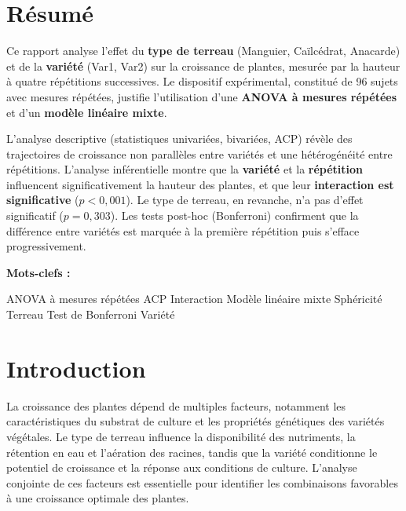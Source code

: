 \documentclass[12pt, a4paper]{report}
\begin{document}
\chapter*{Résumé}


Ce rapport analyse l'effet du \textbf{type de terreau} (Manguier, Caïlcédrat, Anacarde) et
de la \textbf{variété} (Var1, Var2) sur la croissance de plantes, mesurée par la hauteur à
quatre répétitions successives. Le dispositif expérimental, constitué de 96 sujets avec
mesures répétées, justifie l'utilisation d'une \textbf{ANOVA à mesures répétées} et d'un
\textbf{modèle linéaire mixte}.

\vspace{0.4cm}

\noindent
L'analyse descriptive (statistiques univariées, bivariées, ACP) révèle des trajectoires de
croissance non parallèles entre variétés et une hétérogénéité entre répétitions. L'analyse
inférentielle montre que la \textbf{variété} et la \textbf{répétition} influencent
significativement la hauteur des plantes, et que leur \textbf{interaction est significative}
($p < 0{,}001$). Le type de terreau, en revanche, n'a pas d'effet significatif ($p = 0{,}303$).
Les tests post-hoc (Bonferroni) confirment que la différence entre variétés est marquée à la
première répétition puis s'efface progressivement.

\vspace{1cm}

\textbf{Mots-clefs : }

\noindent
ANOVA à mesures répétées \textbullet{} ACP \textbullet{} Interaction\textbullet{} Modèle linéaire mixte \textbullet{} Sphéricité \textbullet{} Terreau \textbullet{} Test de Bonferroni \textbullet{}Variété

\chapter*{Introduction}

La croissance des plantes dépend de multiples facteurs, notamment les caractéristiques du
substrat de culture et les propriétés génétiques des variétés végétales. Le type de terreau
influence la disponibilité des nutriments, la rétention en eau et l'aération des racines,
tandis que la variété conditionne le potentiel de croissance et la réponse aux conditions de
culture. L'analyse conjointe de ces facteurs est essentielle pour identifier les combinaisons
favorables à une croissance optimale des plantes.
\end{document}
